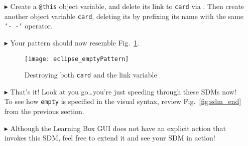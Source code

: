 \begin{itemize}
\item[$\blacktriangleright$] Create a \texttt{@this} object variable, and delete its link to \texttt{card} via . Then create another
object variable \texttt{card}, deleting its by prefixing its name with the same \texttt{`-~-'} operator.

\vspace{0.5cm}

\item[$\blacktriangleright$] Your pattern should now resemble Fig.~\ref{fig:emptyPattern}.

\vspace{0.5cm}

\begin{figure}[htpb]
\begin{center}
  \texttt{[image: eclipse\_emptyPattern]}
  \caption{Destroying both \texttt{card} and the link variable}
  \label{fig:emptyPattern}
\end{center}
\end{figure}

\vspace{0.5cm}

\item[$\blacktriangleright$] That's it! Look at you go\ldots you're just speeding through these SDMs now! To see how \texttt{empty} is specified in the visual
syntax, review Fig.~\ref{fig:sdm_end} from the previous section.

\vspace{0.5cm}

\item[$\blacktriangleright$] Although the Learning Box GUI does not have an explicit action that invokes this SDM, feel free to extend it and see your SDM in
action!

\end{itemize}
